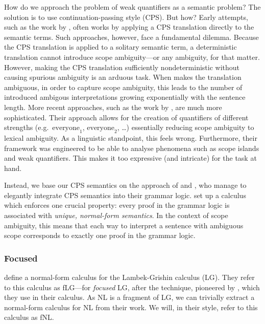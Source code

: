 \documentclass[10pt,a4paper]{llncs}
\begin{document}
How do we approach the problem of weak quantifiers as a semantic
problem? The solution is to use continuation-passing style (CPS).
But how? Early attempts, such as the work by \citep{barker2002},
often works by applying a CPS translation directly to the semantic
terms. Such approaches, however, face a fundamental dilemma.
Because the CPS translation is applied to a solitary semantic term,
a deterministic translation cannot introduce scope ambiguity---or any
ambiguity, for that matter.
However, making the CPS translation sufficiently nondeterministic
without causing spurious ambiguity is an arduous task. When
\citeauthor{barker2002} makes the translation ambiguous, in order to
capture scope ambiguity, this leads to the number of introduced
ambigous interpretations growing exponentially with the sentence
length.
More recent approaches, such as the work by \citet{kiselyov2014}, are
much more sophisticated. Their approach allows for the creation of
quantifiers of different strengths (e.g.\ $\text{everyone}_1$,
$\text{everyone}_2$, \dots) essentially reducing scope ambiguity
to lexical ambiguity. As a linguistic standpoint, this feels wrong.
Furthermore, their framework was engineered to be able to analyse
phenomena such as scope islands and weak quantifiers.
This makes it too expressive (and intricate) for the task at hand.

Instead, we base our CPS semantics on the approach of
\citet{moortgat2012} and \citet{bastenhof2013}, who manage to
elegantly integrate CPS semantics into their grammar logic.
\citeauthor{moortgat2012} set up a calculus which enforces
one crucial property: every proof in the grammar logic is associated
with \emph{unique, normal-form semantics}.
In the context of scope ambiguity, this means that each way to
interpret a sentence with ambiguous scope corresponds to exactly one
proof in the grammar logic.

\subsubsection{Focused {\NLCL}}%
\label{sec:normal-form}

\citet[][sec. 3.1]{moortgat2012} define a normal-form calculus for the
Lambek-Grishin calculus (LG).
They refer to this calculus as fLG---for \emph{focused} LG, after
the technique, pioneered by \citet{andreoli2001}, which
they use in their calculus.
As NL is a fragment of LG, we can trivially extract a normal-form
calculus for NL from their work.
We will, in their style, refer to this calculus as fNL.
\end{document}

